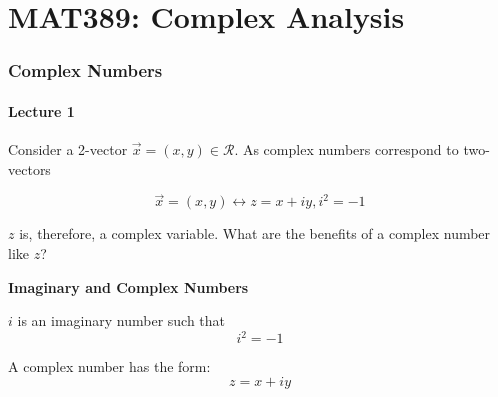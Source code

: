 \documentclass[../notes.tex]{subfiles}
\begin{document}
\part{MAT389: Complex Analysis}

\section{Complex Numbers}
\subsection{Lecture 1}

Consider a 2-vector $ \vec{x} = (x, y) \in \mathcal{R} $. 
As complex numbers correspond to two-vectors 

\begin{equation}
	\vec{x} = (x, y) \leftrightarrow z = x + iy, i^2 = -1
\end{equation}

$ z $ is, therefore, a complex variable. What are the benefits of a complex number like $ z $?


\begin{definition}

	\textbf{Imaginary and Complex Numbers} 

	$ i $ is an imaginary number such that
	\begin{equation}
		i^2 = -1
		\label{eq:389:i}
	\end{equation}

	A complex number has the form:
	\begin{equation}
		z = x + iy
		\label{eq:389:complex}
	\end{equation}
\end{definition}
\end{document}

